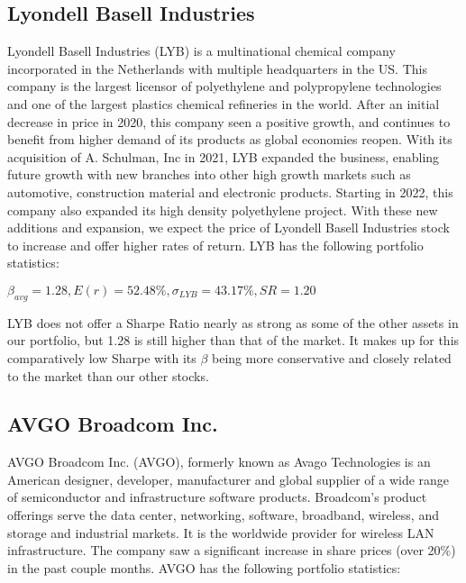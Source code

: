 \documentclass{article}
\begin{document}
\subsection{Lyondell Basell Industries}

Lyondell Basell Industries (LYB) is a multinational chemical company incorporated in the Netherlands with multiple headquarters in the US. This company is the largest licensor of polyethylene and polypropylene technologies and one of the largest plastics chemical refineries in the world. After an initial decrease in price in 2020, this company seen a positive growth, and continues to benefit from higher demand of its products as global economies reopen. With its acquisition of A. Schulman, Inc in 2021, LYB expanded the business, enabling future growth with new branches into other high growth markets such as automotive, construction material and electronic products. Starting in 2022, this company also expanded its high density polyethylene project. With these new additions and expansion, we expect the price of Lyondell Basell Industries stock to increase and offer higher rates of return. LYB has the following portfolio statistics:

\begin{center}
    \begin{math}
        \beta_{avg} = 1.28, E(r) = 52.48\%, \sigma_{LYB} = 43.17\%, SR = 1.20
    \end{math}
\end{center}

LYB does not offer a Sharpe Ratio nearly as strong as some of the other assets in our portfolio, but 1.28 is still higher than that of the market. It makes up for this comparatively low Sharpe with its $\beta$ being more conservative and closely related to the market than our other stocks.

\subsection{AVGO Broadcom Inc.}
AVGO Broadcom Inc. (AVGO), formerly known as Avago Technologies is an American designer, developer, manufacturer and global supplier of a wide range of semiconductor and infrastructure software products. Broadcom's product offerings serve the data center, networking, software, broadband, wireless, and storage and industrial markets. It is the worldwide provider for wireless LAN infrastructure. The company saw a significant increase in share prices (over 20\%) in the past couple months. AVGO has the following portfolio statistics:
\end{document}
